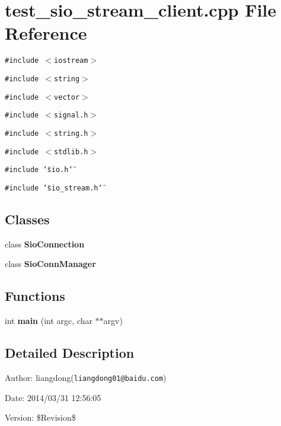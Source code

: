 \section{test\_\-sio\_\-stream\_\-client.cpp File Reference}
\label{test__sio__stream__client_8cpp}
{\tt \#include $<$iostream$>$}\par
{\tt \#include $<$string$>$}\par
{\tt \#include $<$vector$>$}\par
{\tt \#include $<$signal.h$>$}\par
{\tt \#include $<$string.h$>$}\par
{\tt \#include $<$stdlib.h$>$}\par
{\tt \#include \char`\"{}sio.h\char`\"{}}\par
{\tt \#include \char`\"{}sio\_\-stream.h\char`\"{}}\par
\subsection*{Classes}
\begin{CompactItemize}
\item 
class {\bf Sio\-Connection}
\item 
class {\bf Sio\-Conn\-Manager}
\end{CompactItemize}
\subsection*{Functions}
\begin{CompactItemize}
\item 
int {\bf main} (int argc, char $\ast$$\ast$argv)\label{test__sio__stream__client_8cpp_a0}

\end{CompactItemize}


\subsection{Detailed Description}
\begin{Desc}
\item[Author:]liangdong({\tt liangdong01@baidu.com}) \end{Desc}
\begin{Desc}
\item[Date:]2014/03/31 12:56:05 \end{Desc}
\begin{Desc}
\item[Version:]\$Revision\$ \end{Desc}

